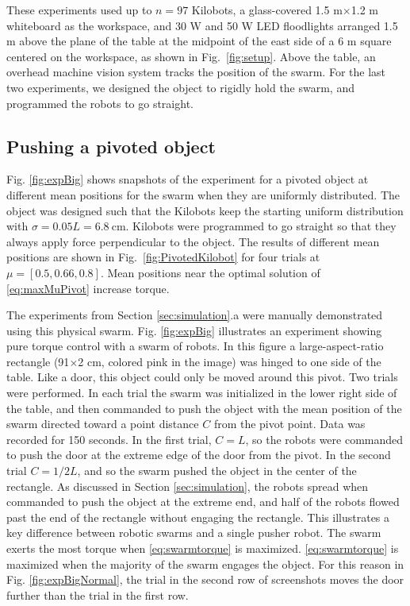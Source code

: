 These experiments used up to $n = 97$ Kilobots, a glass-covered 1.5 m$\times$1.2 m whiteboard as the workspace, and 30 W and 50 W LED floodlights arranged 1.5 m above the plane of the table at the midpoint of the east side of a 6 m square centered on the workspace, as shown in Fig.~\ref{fig:setup}. Above  the table, an overhead machine vision system tracks the position of the swarm. For the last two experiments, we designed the object to rigidly hold the swarm, and programmed the robots to go straight. 

\subsection{Pushing a pivoted object}

Fig. \ref{fig:expBig} shows snapshots of the experiment for a pivoted object at different mean positions for the swarm when they are uniformly distributed. The object was designed such that the Kilobots keep the starting uniform distribution with $\sigma = 0.05 L = \SI{6.8}{\centi \metre}$. Kilobots were programmed to go straight so that they always apply force perpendicular to the object. The results of different mean positions are shown in Fig.~\ref{fig:PivotedKilobot} for four trials at $\mu=[0.5, 0.66, 0.8]$. Mean positions near the optimal solution of \eqref{eq:maxMuPivot} increase torque.


The experiments from Section \ref{sec:simulation}.a were manually demonstrated using this physical swarm.
Fig. \ref{fig:expBig} illustrates an experiment showing pure torque control with a swarm of robots. In this figure a large-aspect-ratio rectangle  (91$\times$2 cm, colored pink in the image) was hinged to one side of the table.  Like a door, this object could only be moved around this pivot. 
Two trials were performed.  In each trial the swarm was initialized in the lower right side of the table, and then commanded to push the object with the mean position of the swarm directed toward a point distance $C$ from the pivot point. Data was recorded for 150 seconds.
In the first trial, $C = L$, so the robots were commanded to push the door at the extreme edge of the door from the pivot.  
In the second trial $C = 1/2 L$, and so the swarm pushed the object in the center of the rectangle.
As discussed in Section \ref{sec:simulation}, the robots spread when commanded to push the object at the extreme end, and half of the robots flowed past the end of the rectangle without engaging the rectangle.
 This illustrates a key difference between robotic swarms and a single pusher robot. The swarm exerts the most torque when  \eqref{eq:swarmtorque} is maximized.
  \eqref{eq:swarmtorque} is maximized when the majority of the swarm engages the object.
For this reason in Fig. \ref{fig:expBigNormal}, the trial in the second row of screenshots moves the door further than the  trial in the  first row.


